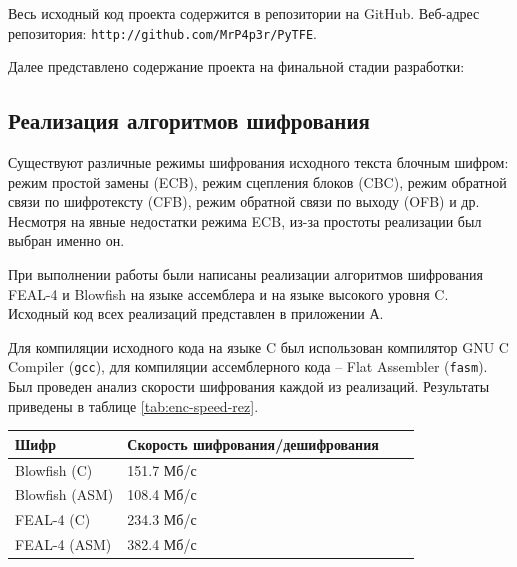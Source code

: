 
Весь исходный код проекта содержится в репозитории на GitHub.
Веб-адрес репозитория: \verb'http://github.com/MrP4p3r/PyTFE'.

\newpage
Далее представлено содержание проекта на финальной стадии разработки:



\newpage
\subsection{Реализация алгоритмов шифрования} %

Существуют различные режимы шифрования исходного текста блочным
шифром: режим простой замены (ECB), режим сцепления блоков (CBC),
режим обратной связи по шифротексту (CFB), режим обратной связи по
выходу (OFB) и др. Несмотря на явные недостатки режима ECB,
из-за простоты реализации был выбран именно он.

При выполнении работы были написаны реализации алгоритмов шифрования
FEAL-4 и Blowfish на языке ассемблера и на языке высокого уровня C.
Исходный код всех реализаций представлен в приложении А.

Для компиляции исходного кода на языке C был использован компилятор
GNU C Compiler (\texttt{gcc}),
для компиляции ассемблерного кода -- Flat Assembler (\texttt{fasm}).
Был проведен анализ скорости шифрования каждой из реализаций. Результаты
приведены в таблице \ref{tab:enc-speed-rez}.

\noindent
\begin{minipage}{\linewidth}
  \vspace{2.5mm}
  \label{tab:enc-speed-rez}
  \vspace{-2.5mm}
  \begin{tabular}{|l|l|l|l|}
    \hline
    Шифр            & Скорость шифрования/дешифрования \\\hline
    Blowfish (C)    & 151.7 Мб/с  \\\hline
    Blowfish (ASM)  & 108.4 Мб/с  \\\hline
    FEAL-4 (C)      & 234.3 Мб/с  \\\hline
    FEAL-4 (ASM)    & 382.4 Мб/с  \\\hline
  \end{tabular}
  \vspace{2.5mm}
\end{minipage}\\

